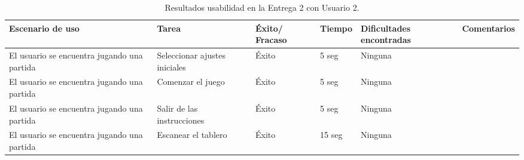 \begin{table}[h]
  \begin{center}
    \begin{tabular}{|p{2.5cm}|p{1.75cm}|p{1.25cm}|p{1.25cm}|p{2.75cm}|p{3.5cm}|}

      \hline
        \rowcolor{Gray} \textbf{Escenario de uso}
        & \textbf{Tarea}
        & \textbf{Éxito/ Fracaso}
        & \textbf{Tiempo}
        & \textbf{Dificultades encontradas}
        & \textbf{Comentarios}\\

      \hline
      El usuario se encuentra jugando una partida
      & Seleccionar ajustes iniciales
      & Éxito
      & 5 seg
      & Ninguna
      &\\

      \hline
      El usuario se encuentra jugando una partida
      & Comenzar el juego
      & Éxito
      & 5 seg
      & Ninguna
      &\\

      \hline
      El usuario se encuentra jugando una partida
      & Salir de las instrucciones
      & Éxito
      & 5 seg
      & Ninguna
      &\\

      \hline
      El usuario se encuentra jugando una partida
      & Escanear el tablero
      & Éxito
      & 15 seg
      & Ninguna
      &\\

      \hline

    \end{tabular}

    \caption{Resultados usabilidad en la Entrega 2 con Usuario 2.}
    \label{tabla-entrega-2-usuario2}

  \end{center}
\end{table}


